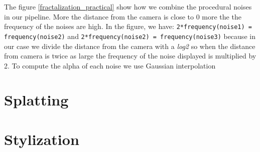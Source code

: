 The figure \ref{fractalization_practical} show how we combine the procedural noises in our pipeline. More the distance from the camera is close to 0 more the the frequency of the noises are high. In the figure, we have: \texttt{2*frequency(noise1) = frequency(noise2)} and \texttt{2*frequency(noise2) = frequency(noise3)} because in our case we divide the distance from the camera with a \textit{log2} so when the distance from camera is twice as large the frequency of the noise displayed is multiplied by 2. To compute the alpha of each noise we use Gaussian interpolation






\section{Splatting}


\section{Stylization}
